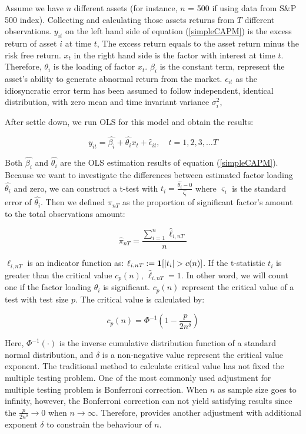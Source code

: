 \documentclass[12pt]{article}
\begin{document}
Assume we have $n$ different assets (for instance, $n$ = 500 if using data from S\&P 500 index). 
Collecting and calculating those assets returns from $T$ different observations. 
$y_{it}$ on the left hand side of equation (\ref{simpleCAPM}) is the excess return of asset $i$ at time $t$, The excess return equals to the asset return minus the risk free return. 
$x_t$  in the right hand side is the factor with interest at time $t$. 
Therefore, $\theta_{i}$ is the loading of factor $x_{t}$. 
$\beta_{i}$ is the constant term, represent the asset's ability to generate abnormal return from the market. 
$\epsilon_{it}$ as the idiosyncratic error term has been assumed to follow independent, identical distribution, with zero mean and time invariant variance  $\sigma_i^2$,


After settle down, we run OLS for this model and obtain the results:

\[ y_{it} =\hat{\beta_i} + \hat{\theta_{i}}x_t + \hat{\epsilon}_{it}, \quad t = 1, 2, 3, \dots  T     \]

Both $\hat{\beta_i}$ and $\hat{\theta_{i}}$ are the OLS estimation results of equation  (\ref{simpleCAPM}). 
Because we want to investigate the differences between estimated factor loading $\hat{\theta_{i}}$ and zero, we can construct a t-test with $t_{i} = \frac{\hat{\theta_{i}} - 0}{\hat{\varsigma_{i}}}$ where $\varsigma_{i}$ is the standard error of $\hat{\theta_{i}}$.  
Then we defined $\pi_{nT}$ as the proportion of significant factor's amount to the total observations amount:

\[  \hat{\pi}_{nT} = \frac{\sum_{i=1}^n \hat{\ell}_{i,nT}}{n} \tag{2} \label{pi_function} \]

$\ell_{i,nT}$ is an indicator function as: $\ell_{i,nT} := {\bf1}[|t_{i}|>c(n)]$. 
If the t-statistic $t_i$ is greater than the critical value $c_p(n)$,  $\hat{\ell}_{i,nT} = 1$. 
In other word, we will count one if the factor loading $\hat{\theta}_{i}$ is significant. 
$c_p(n)$ represent the critical value of a test with test size $p$. 
The critical value is calculated by:

\[   c_p(n) = \Phi^{-1}(1 - \frac{p}{2n^\delta})   \tag{3} \label{critical_value_function} \]

Here, $\Phi^{-1}(\cdot)$ is the inverse cumulative distribution function of a standard normal distribution, and $\delta$ is a non-negative value represent the critical value exponent. 
The traditional method to calculate critical value has not fixed the multiple testing problem. 
One of the most commonly used adjustment for multiple testing problem is Bonferroni correction. 
When $n$ as sample size goes to infinity, however, the Bonferroni correction can not yield satisfying results since the $\frac{p}{2n^{\delta}} \to 0$ when $n \to \infty$. 
Therefore,  provides another adjustment with additional exponent $\delta$ to constrain the behaviour of $n$.
\end{document}
